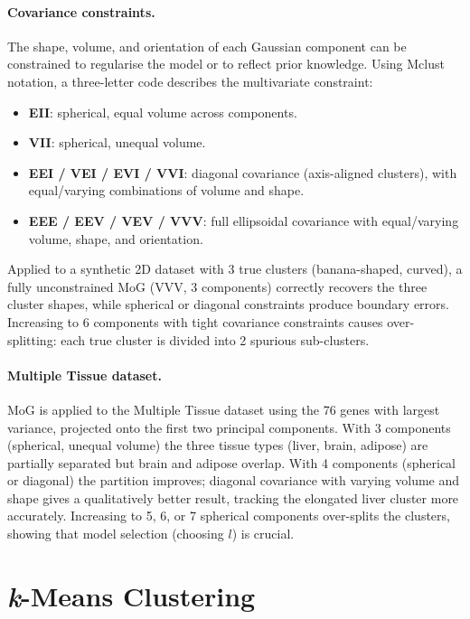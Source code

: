 \documentclass[11pt, oneside]{book}
\begin{document}
\paragraph{Covariance constraints.}
The shape, volume, and orientation of each Gaussian component can be constrained
to regularise the model or to reflect prior knowledge.
Using Mclust notation, a three-letter code describes the multivariate constraint:

\begin{itemize}
  \item \textbf{EII}: spherical, equal volume across components.
  \item \textbf{VII}: spherical, unequal volume.
  \item \textbf{EEI / VEI / EVI / VVI}: diagonal covariance (axis-aligned clusters),
        with equal/varying combinations of volume and shape.
  \item \textbf{EEE / EEV / VEV / VVV}: full ellipsoidal covariance with
        equal/varying volume, shape, and orientation.
\end{itemize}

Applied to a synthetic 2D dataset with 3 true clusters (banana-shaped, curved),
a fully unconstrained MoG (VVV, 3 components) correctly recovers the three
cluster shapes, while spherical or diagonal constraints produce boundary errors.
Increasing to 6 components with tight covariance constraints causes over-splitting:
each true cluster is divided into 2 spurious sub-clusters.

\paragraph{Multiple Tissue dataset.}
MoG is applied to the Multiple Tissue dataset using the 76 genes with largest
variance, projected onto the first two principal components.
With 3 components (spherical, unequal volume) the three tissue types (liver,
brain, adipose) are partially separated but brain and adipose overlap.
With 4 components (spherical or diagonal) the partition improves;
diagonal covariance with varying volume and shape gives a qualitatively better
result, tracking the elongated liver cluster more accurately.
Increasing to 5, 6, or 7 spherical components over-splits the clusters,
showing that model selection (choosing $l$) is crucial.

\section{\textit{k}-Means Clustering}
\end{document}
